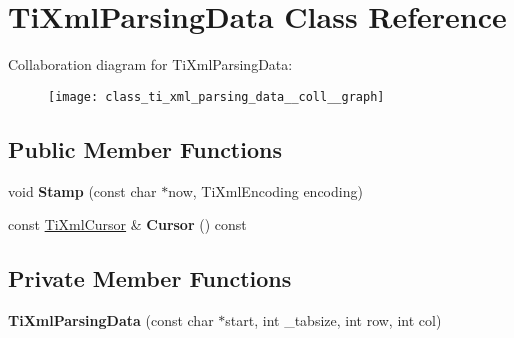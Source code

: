 \hypertarget{class_ti_xml_parsing_data}{\section{\-Ti\-Xml\-Parsing\-Data \-Class \-Reference}
\label{class_ti_xml_parsing_data}
}


\-Collaboration diagram for \-Ti\-Xml\-Parsing\-Data\-:
\nopagebreak
\begin{figure}[H]
\begin{center}
\leavevmode
\texttt{[image: class\_ti\_xml\_parsing\_data\_\_coll\_\_graph]}
\end{center}
\end{figure}
\subsection*{\-Public \-Member \-Functions}
\begin{DoxyCompactItemize}
\item 
\hypertarget{class_ti_xml_parsing_data_a65cee8ab77a36c605db08c84b4c30a7d}{void {\bfseries \-Stamp} (const char $\ast$now, \-Ti\-Xml\-Encoding encoding)}\label{class_ti_xml_parsing_data_a65cee8ab77a36c605db08c84b4c30a7d}

\item 
\hypertarget{class_ti_xml_parsing_data_a9e63d965fdb53ff4ac711e105269e918}{const \hyperlink{struct_ti_xml_cursor}{\-Ti\-Xml\-Cursor} \& {\bfseries \-Cursor} () const }\label{class_ti_xml_parsing_data_a9e63d965fdb53ff4ac711e105269e918}

\end{DoxyCompactItemize}
\subsection*{\-Private \-Member \-Functions}
\begin{DoxyCompactItemize}
\item 
\hypertarget{class_ti_xml_parsing_data_aa5beaf71579a91d6942277f417899ab9}{{\bfseries \-Ti\-Xml\-Parsing\-Data} (const char $\ast$start, int \-\_\-tabsize, int row, int col)}\label{class_ti_xml_parsing_data_aa5beaf71579a91d6942277f417899ab9}

\end{DoxyCompactItemize}
